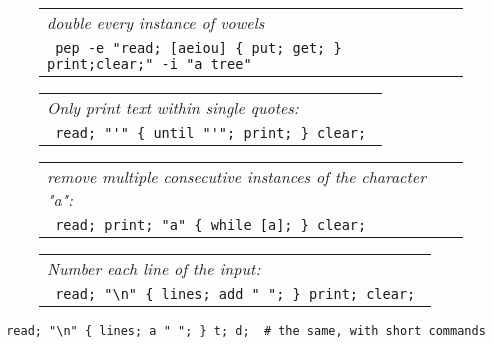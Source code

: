 \documentclass[a4paper,12pt]{article}
\begin{document}
 \begin{figure}
 \begin{tabular}{ l }
 \emph{ double every instance of vowels    } \\ 
 \verb| pep -e "read; [aeiou] { put; get; } print;clear;" -i "a tree" |
 \end{tabular} 
 \end{figure}
 \begin{figure}
 \begin{tabular}{ l }
 \emph{ Only print text within single quotes: } \\ 
 \verb| read; "'" { until "'"; print; } clear; |
 \end{tabular} 
 \end{figure}
 \begin{figure}
 \begin{tabular}{ l }
 \emph{ remove multiple consecutive instances of the character "a": } \\ 
 \verb| read; print; "a" { while [a]; } clear; |
 \end{tabular} 
 \end{figure}
 \begin{figure}
 \begin{tabular}{ l }
 \emph{ Number each line of the input: } \\ 
 \verb| read; "\n" { lines; add " "; } print; clear; |
 \end{tabular} 
 \end{figure} 
 \verb| read; "\n" { lines; a " "; } t; d;  # the same, with short commands |
\end{document}
